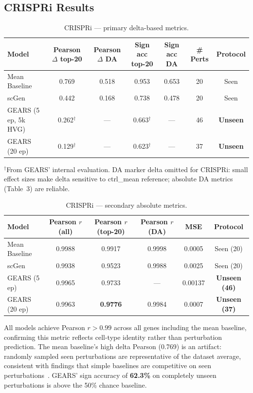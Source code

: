 \documentclass[11pt,letterpaper]{article}
\begin{document}
\subsection{CRISPRi Results}

\begin{table}[h]
\centering
\caption{CRISPRi --- primary delta-based metrics.}
\small
\begin{tabular}{lcccccc}
\toprule
Model & Pearson $\Delta$ top-20 & Pearson $\Delta$ DA & Sign acc top-20 & Sign acc DA & \# Perts & Protocol \\
\midrule
Mean Baseline         & 0.769   & 0.518 & 0.953 & 0.653 & 20 & Seen \\
scGen                 & 0.442   & 0.168 & 0.738 & 0.478 & 20 & Seen \\
GEARS (5 ep, 5k HVG)  & 0.262$^\dagger$ & --- & 0.663$^\dagger$ & --- & 46 & \textbf{Unseen} \\
GEARS (20 ep)         & 0.129$^\dagger$ & --- & 0.623$^\dagger$ & --- & 37 & \textbf{Unseen} \\
\bottomrule
\end{tabular}
\vspace{2pt}
{\footnotesize $^\dagger$From GEARS' internal evaluation. DA marker delta omitted for CRISPRi: small effect sizes make delta sensitive to ctrl\_mean reference; absolute DA metrics (Table~3) are reliable.}
\end{table}

\begin{table}[h]
\centering
\caption{CRISPRi --- secondary absolute metrics.}
\small
\begin{tabular}{lccccc}
\toprule
Model & Pearson $r$ (all) & Pearson $r$ (top-20) & Pearson $r$ (DA) & MSE & Protocol \\
\midrule
Mean Baseline        & 0.9988 & 0.9917 & 0.9998 & 0.0005  & Seen (20) \\
scGen                & 0.9938 & 0.9523 & 0.9988 & 0.0025  & Seen (20) \\
GEARS (5 ep)         & 0.9965 & 0.9733 & ---    & 0.00137 & \textbf{Unseen (46)} \\
GEARS (20 ep)        & 0.9963 & \textbf{0.9776} & 0.9984 & 0.0007 & \textbf{Unseen (37)} \\
\bottomrule
\end{tabular}
\end{table}

All models achieve Pearson $r > 0.99$ across all genes including the mean baseline, confirming
this metric reflects cell-type identity rather than perturbation prediction.
The mean baseline's high delta Pearson (0.769) is an artifact: randomly sampled seen perturbations
are representative of the dataset average, consistent with findings that simple baselines are
competitive on seen perturbations~\cite{boiarsky2023,wenk2024}. GEARS' sign accuracy of
\textbf{62.3\%} on completely unseen perturbations is above the 50\% chance baseline.
\end{document}
